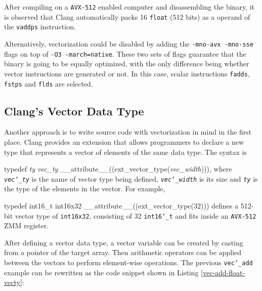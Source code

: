\documentclass[logo,bsc,singlespacing,parskip]{infthesis}
\newcommand{\dtfloat}{\texttt{float}}
\newenvironment{VerbatimCompact}
  {\vspace*{-2.5mm}\VerbatimEnvironment
   \par\Verbatim}
  {\endVerbatim\vspace*{-2.4mm}}
\begin{document}
After compiling on a \texttt{AVX-512} enabled computer and disassembling the
binary, it is observed that Clang automatically packs 16 \dtfloat{} (512 bits)
as a operand of the \texttt{vaddps} instruction. 

Alternatively, vectorization could be disabled by adding the \texttt{-mno-avx
-mno-sse} flags on top of \texttt{-O3 -march=native}. These two sets of flags
guarantee that the binary is going to be equally optimized, with the only difference being whether vector instructions are generated or not. In this case, 
scalar instructions \texttt{fadds}, \texttt{fstps} and \texttt{flds} are
selected.


\subsection{Clang's Vector Data Type}

Another approach is to write source code with vectorization in mind in the first
place. Clang provides an extension that allows programmers to declare a new type
that represents a vector of elements of the same data type. The syntax is 
\begin{VerbatimCompact}[commandchars=\\\{\}]
typedef \textit{ty} \textit{vec_ty} __attribute__((ext_vector_type(\textit{vec_width}))), 
\end{VerbatimCompact}
where \textit{\texttt{vec\char`_ty}} is the name of vector type being defined,
\textit{\texttt{vec\char`_width}} is its size and \textit{\texttt{ty}} is the
type of the elements in the vector. For example, 
\begin{VerbatimCompact}[commandchars=\\\{\}]
typedef int16_t int16x32 __attribute__((ext_vector_type(32)))
\end{VerbatimCompact}
defines a 512-bit vector type of \texttt{int16x32}, consisting of 32
\texttt{int16\char`_t} and fits inside an \texttt{AVX-512} ZMM register. 

After defining a vector data type, a vector variable can be created by casting
from a pointer of the target array. Then arithmetic operators can be applied
between the vectors to perform element-wise operations. The previous
\texttt{vec\char`_add} example can be rewritten as the code snippet shown in Listing
\ref{vec-add-float-vecty}:
\end{document}
